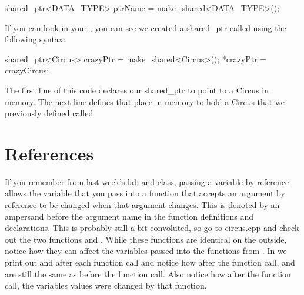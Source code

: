 \documentclass{tufte-handout}
\begin{document}
\begin{code}
shared\_ptr<DATA\_TYPE> ptrName = make\_shared<DATA\_TYPE>();
\end{code}



If you can look in your , you can see we created a shared\_ptr  called  using the following syntax:

\begin{code}
shared\_ptr<Circus> crazyPtr = make\_shared<Circus>();
*crazyPtr = crazyCircus;
\end{code}

The first line of this code declares our shared\_ptr to point to a Circus in memory.  The next line defines that place in memory to hold a Circus that we previously defined called 

\section{References}

If you remember from last week's lab and class, passing a variable by reference allows the variable that you pass into a function that accepts an argument by reference to be changed when that argument changes.
This is denoted by an ampersand before the argument name in the function definitions and declarations.
This is probably still a bit convoluted, so go to circus.cpp and check out the two functions  and .  
While these functions are identical on the outside, notice how they can affect the variables passed into the functions from . 
In  we print out  and  after each function call and notice how after the  function call,  and  are still the same as before the function call.
Also notice how after the  function call, the variables values were changed by that function.
\end{document}
